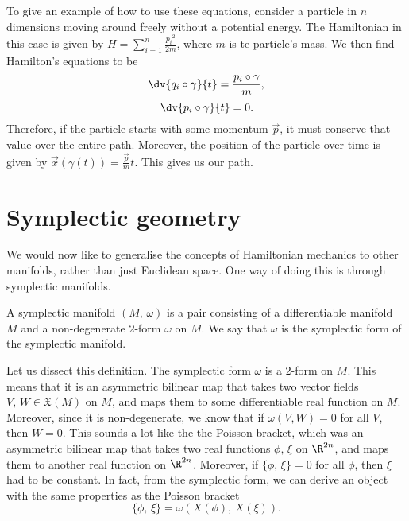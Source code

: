 \documentclass{article}
\begin{document}
\begin{multicols}{2}
	To give an example of how to use these equations, consider a particle in \(n\) dimensions moving around freely without a potential energy.
	The Hamiltonian in this case is given by \(H = \sum_{i=1}^n\frac{{p_i}^2}{2m}\), where \(m\) is te particle's mass. We then find Hamilton's equations to be
	\begin{equation}
		\dv{q_i\circ\gamma}{t} = \frac{p_i\circ\gamma}{m},
	\end{equation}
	\begin{equation}
		\dv{p_i\circ\gamma}{t} = 0.
	\end{equation}
	Therefore, if the particle starts with some momentum \(\vec{p}\), it must conserve that value over the entire path.
	Moreover, the position of the particle over time is given by \(\vec{x}(\gamma(t)) = \frac{\vec{p}}{m}t\). This gives us our path.
	\section{Symplectic geometry}
	We would now like to generalise the concepts of Hamiltonian mechanics to other manifolds, rather than just Euclidean space. One way of doing this is through symplectic manifolds.
	\begin{definition}
		A symplectic manifold \((M,\,\omega)\) is a pair consisting of a differentiable manifold \(M\) and a non-degenerate \(2\)-form \(\omega\) on \(M\). We say that \(\omega\) is the symplectic form of the symplectic manifold.
	\end{definition}
	Let us dissect this definition. The symplectic form \(\omega\) is a \(2\)-form on \(M\). This means that it is an asymmetric bilinear map that takes two vector fields \(V,\,W\in\mathfrak{X}(M)\) on \(M\), and maps them to some differentiable real function on \(M\). Moreover, since it is non-degenerate, we know that if \(\omega(V,W) = 0\) for all \(V\), then \(W=0\).
	This sounds a lot like the the Poisson bracket, which was an asymmetric bilinear map that takes two real functions \(\phi,\,\xi\) on \(\R^{2n}\), and maps them to another real function on \(\R^{2n}\). Moreover, if \(\{\phi,\,\xi\}=0\) for all \(\phi\), then \(\xi\) had to be constant.
	In fact, from the symplectic form, we can derive an object with the same properties as the Poisson bracket
	\begin{equation}
		\{\phi,\,\xi\} = \omega(X(\phi),\,X(\xi)).

\end{equation}
\end{multicols}
\end{document}

